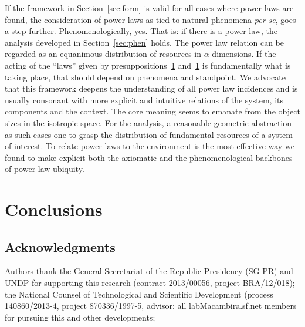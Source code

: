 \documentclass[a4paper, 11pt]{article} %
\begin{document}
If the framework in Section~\ref{sec:form} is valid for all cases where power laws are found,
the consideration of power laws as tied to natural phenomena \emph{per se}, goes a step further. Phenomenologically, yes. That is: if there is
a power law, the analysis developed in Section~\ref{sec:phen} holds.
The power law relation can be regarded as an equanimous distribution
of resources in $\alpha$ dimensions.
If the acting of the ``laws'' given by presuppositions~\ref{} and~\ref{} is fundamentally what is taking place, that should depend on phenomena
and standpoint.
We advocate that this framework deepens the understanding of all power law
incidences and is usually consonant with more explicit and intuitive 
relations of the system, its components and the context.
The core meaning seems to emanate from
the object sizes in the isotropic space.
For the analysis, a reasonable geometric abstraction as such
eases one to grasp the distribution
of fundamental resources of a system of interest.
To relate power laws to the environment is the most effective
way we found to make explicit both the axiomatic
and the phenomenological backbones of power law ubiquity.


\section{Conclusions}
\subsection*{Acknowledgments}
Authors thank
the General Secretariat of the Republic Presidency (SG-PR) and UNDP for supporting this
research (contract 2013/00056, project BRA/12/018); the National Counsel of Technological 
and Scientific Development (process 140860/2013-4, project 870336/1997-5,
advisor: 
all
labMacambira.sf.net members for pursuing this and other developments;

%
%



\end{document}

